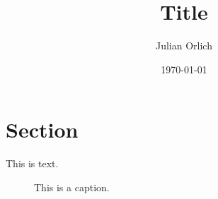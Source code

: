 \documentclass{article}
\title{Title}
\author{Julian Orlich}
\date{\today}
\begin{document}
\maketitle

\section{Section}

This is text.

\begin{figure}[h]
  \centering
  \caption{This is a caption.}
\end{figure}
\end{document}
